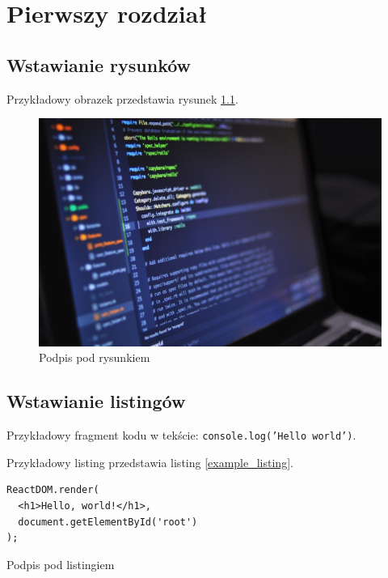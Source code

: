 \documentclass[a4paper,12pt,polish,twoside]{extreport}
\begin{document}


\null\newpage

\tableofcontents

\chapter{Pierwszy rozdział}

\section{Wstawianie rysunków}
Przykładowy obrazek przedstawia rysunek \ref{example_image}.

\begin{figure}[H]
    \centering
    \includegraphics[width=\textwidth,keepaspectratio]{img/example_photo.jpeg}
    \caption[Podpis w spisie rysunków]{Podpis pod rysunkiem}
    \label{example_image}
\end{figure}

\section{Wstawianie listingów}
Przykładowy fragment kodu w tekście: \texttt{console.log('Hello world')}.

Przykładowy listing przedstawia listing \ref{example_listing}.

\begin{code}[H]
\begin{lstlisting}
ReactDOM.render(
  <h1>Hello, world!</h1>,
  document.getElementById('root')
);
\end{lstlisting}
\caption[Podpis w spisie listingów]{Podpis pod listingiem}
\label{example_listing}
\end{code}
\end{document}
